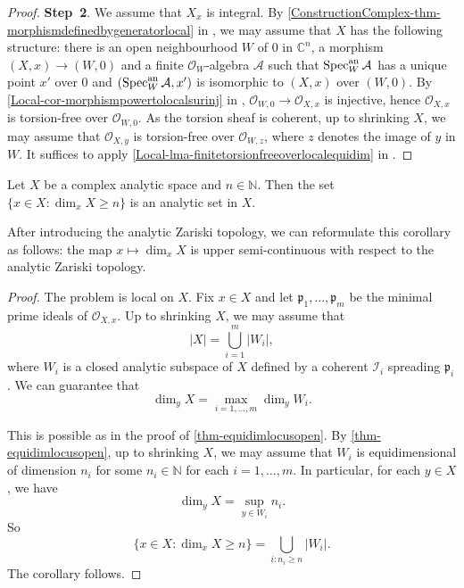 \begin{proof}
    \textbf{Step~2}. We assume that $X_x$ is integral. By \cref{ConstructionComplex-thm-morphismdefinedbygeneratorlocal} in , we may assume that  $X$ has the following structure: there is an open neighbourhood $W$ of $0$ in $\mathbb{C}^n$, a morphism $(X,x)\rightarrow (W,0)$ and a finite $\mathcal{O}_W$-algebra $\mathcal{A}$ such that $\operatorname{Spec}^{\mathrm{an}}_W \mathcal{A}$ has a unique point $x'$ over $0$ and $(\operatorname{Spec}^{\mathrm{an}}_W \mathcal{A},x')$ is isomorphic to $(X,x)$ over $(W,0)$. By \cref{Local-cor-morphismpowertolocalsurinj} in , $\mathcal{O}_{W,0}\rightarrow \mathcal{O}_{X,x}$ is injective, hence $\mathcal{O}_{X,x}$ is torsion-free over $\mathcal{O}_{W,0}$. As the torsion sheaf is coherent, up to shrinking $X$, we may assume that $\mathcal{O}_{X,y}$ is torsion-free over $\mathcal{O}_{W,z}$, where $z$ denotes the image of $y$ in $W$. It suffices to apply \cref{Local-lma-finitetorsionfreeoverlocalequidim} in .
\end{proof}

\begin{corollary}
    Let $X$ be a complex analytic space and $n\in \mathbb{N}$. Then the set $\{x\in X:\dim_x X\geq n\}$ is an analytic set in $X$.

\end{corollary}
After introducing the analytic Zariski topology, we can reformulate this corollary as follows: the map $x\mapsto \dim_x X$ is upper semi-continuous with respect to the analytic Zariski topology.
\begin{proof}
    The problem is local on $X$. Fix $x\in X$ and let $\mathfrak{p}_1,\ldots,\mathfrak{p}_m$ be the minimal prime ideals of $\mathcal{O}_{X,x}$. Up to shrinking $X$, we may assume that 
    \[
        |X|=\bigcup_{i=1}^m |W_i|,  
    \]
    where $W_i$ is a closed analytic subspace of $X$ defined by a coherent $\mathcal{I}_i$ spreading $\mathfrak{p}_i$. We can guarantee that
    \[
        \dim_y X=\max_{i=1,\ldots,m}\dim_y W_i.   
    \]
    
    This is possible as in the proof of \cref{thm-equidimlocusopen}. By \cref{thm-equidimlocusopen}, up to shrinking $X$, we may assume that $W_i$ is equidimensional of dimension $n_i$ for some $n_i\in \mathbb{N}$ for each $i=1,\ldots,m$. In particular, for each $y\in X$, we have
    \[
        \dim_y X=\sup_{y\in W_i} n_i.  
    \]
    So 
    \[
        \{x\in X:\dim_x X\geq n\}=\bigcup_{i: n_i\geq n} |W_i|.  
    \]
    The corollary follows.
\end{proof}



